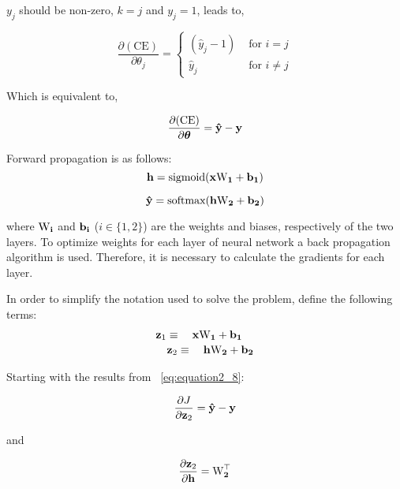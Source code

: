 $y_{j}$ should be non-zero, $k=j$ and $y_{j}=1$, leads to,

\begin{equation}
\label{eq:equation_CE_5}
\frac{\partial(\textrm{CE})}{\partial{\theta_{j}}} = \begin{cases}
(\hat{y}_{j} - 1)&\text{ for }i=j \\
\hat{y}_{j}&\text{ for }i\neq j
\end{cases}
\end{equation}

Which is equivalent to,

\begin{equation}
\frac{\partial(\textrm{CE})}{\partial{\boldsymbol\theta}} = \bf{\hat{y}} - \bf{y}
\end{equation}

\noindent Forward propagation is as follows:
\begin{equation}
{\bf h} = \textrm{sigmoid}({\bf x\textrm{W}_{1} + b_{1}}) 
\end{equation}

\begin{equation}
\label{eq:equation2_7}
{\bf \hat{y}} = \textrm{softmax}({\bf h\textrm{W}_{2} + b_{2})}
\end{equation}

\noindent where $\bf{\textrm{W}}_i$ and $\bf{b}_{i}$ ($i\in\{1,2\}$) are
the weights and biases, respectively of the two layers.
\indent To optimize weights for each layer of neural network a back propagation algorithm is used. Therefore, it is necessary to calculate the gradients for each layer.
  
\noindent In order to simplify the notation used to solve the problem, define the following terms:
\begin{equation}
\label{eq:equation2_10}
\begin{multlined}
		 {\bf z}_{1}\equiv \quad{\bf x\textrm{W}_{1} + b_{1}} \\
		{\bf z}_{2}\equiv \quad{\bf h\textrm{W}_{2} + b_{2}}
\end{multlined}
\end{equation}

Starting with the results from ~\ref{eq:equation2_8}:

\begin{equation}
\frac{\partial{J}}{\partial{\bf z}_{2}} = \bf{\hat{y}} - \bf{y}
\end{equation}

and

\begin{equation}
\label{eq:equation2_11}
\frac{\partial{\bf z}_{2}}{\partial{{\bf h}}} = {\bf \textrm{W}^{\top}_{2}}
\end{equation}

